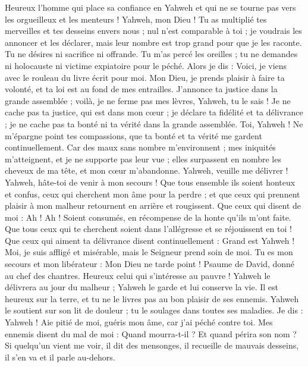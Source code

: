 \begin{multicols}{2}
Heureux l'homme qui place sa confiance en Yahweh et qui ne se tourne pas vers les orgueilleux et les menteurs !
Yahweh, mon Dieu ! Tu as multiplié tes merveilles et tes desseins envers nous ; nul n'est comparable à toi ; je voudrais les annoncer et les déclarer, mais leur nombre est trop grand pour que je les raconte.
Tu ne désires ni sacrifice ni offrande. Tu m'as percé les oreilles ; tu ne demandes ni holocauste ni victime expiatoire pour le péché.
Alors je dis : Voici, je viens avec le rouleau du livre écrit pour moi.
Mon Dieu, je prends plaisir à faire ta volonté, et ta loi est au fond de mes entrailles.
J'annonce ta justice dans la grande assemblée ; voilà, je ne ferme pas mes lèvres, Yahweh, tu le sais !
Je ne cache pas ta justice, qui est dans mon cœur ; je déclare ta fidélité et ta délivrance ; je ne cache pas ta bonté ni ta vérité dans la grande assemblée.
Toi, Yahweh ! Ne m'épargne point tes compassions, que ta bonté et ta vérité me gardent continuellement.
Car des maux sans nombre m'environnent ; mes iniquités m'atteignent, et je ne supporte pas leur vue ; elles surpassent en nombre les cheveux de ma tête, et mon cœur m'abandonne.
Yahweh, veuille me délivrer ! Yahweh, hâte-toi de venir à mon secours !
Que tous ensemble ils soient honteux et confus, ceux qui cherchent mon âme pour la perdre ; et que ceux qui prennent plaisir à mon malheur retournent en arrière et rougissent.
Que ceux qui disent de moi : Ah ! Ah ! Soient consumés, en récompense de la honte qu'ils m'ont faite.
Que tous ceux qui te cherchent soient dans l'allégresse et se réjouissent en toi ! Que ceux qui aiment ta délivrance disent continuellement : Grand est Yahweh !
Moi, je suis affligé et misérable, mais le Seigneur prend soin de moi. Tu es mon secours et mon libérateur : Mon Dieu ne tarde point !
\VerseOne{}Psaume de David, donné au chef des chantres.
Heureux celui qui s'intéresse au pauvre ! Yahweh le délivrera au jour du malheur ;
Yahweh le garde et lui conserve la vie. Il est heureux sur la terre, et tu ne le livres pas au bon plaisir de ses ennemis.
Yahweh le soutient sur son lit de douleur ; tu le soulages dans toutes ses maladies.
Je dis : Yahweh ! Aie pitié de moi, guéris mon âme, car j'ai péché contre toi.
Mes ennemis disent du mal de moi : Quand mourra-t-il ? Et quand périra son nom ?
Si quelqu'un vient me voir, il dit des mensonges, il recueille de mauvais desseins, il s'en va et il parle au-dehors.

\end{multicols}

